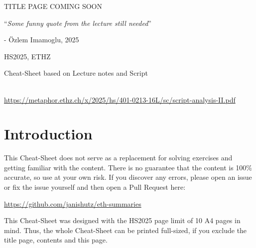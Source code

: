 \documentclass{article}
\begin{document}
\startDocument
\usetcolorboxes


\vspace{2cm}
\begin{Huge}
    \begin{center}
        TITLE PAGE COMING SOON
    \end{center}
\end{Huge}


\vspace{4cm}
\begin{center}
    \begin{Large}
        ``\textit{Some funny quote from the lecture still needed}''
    \end{Large}

    \hspace{3cm} - Özlem Imamoglu, 2025
\end{center}

\vspace{3cm}
\begin{center}
    HS2025, ETHZ\\[0.2cm]
    \begin{Large}
        Cheat-Sheet based on Lecture notes and Script
    \end{Large}\\[0.2cm]

    \url{https://metaphor.ethz.ch/x/2025/hs/401-0213-16L/sc/script-analysis-II.pdf} 
\end{center}


\newpage
{}


\newpage
\section{Introduction}
This Cheat-Sheet does not serve as a replacement for solving exercises and getting familiar with the content.
There is no guarantee that the content is 100\% accurate, so use at your own risk. 
If you discover any errors, please open an issue or fix the issue yourself and then open a Pull Request here:

\url{https://github.com/janishutz/eth-summaries}

This Cheat-Sheet was designed with the HS2025 page limit of 10 A4 pages in mind. 
Thus, the whole Cheat-Sheet can be printed full-sized, if you exclude the title page, contents and this page.




\end{document}

